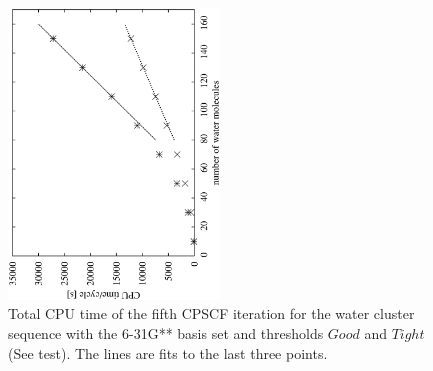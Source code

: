 \documentclass[twocolumn,showpacs,preprintnumbers,amsmath,amssymb]{revtex4}
\begin{document}
\begin{figure}
  \centering
  \caption{\protect
  Total CPU time of the fifth CPSCF iteration for the water
  cluster sequence with
  the 6-31G** basis set and thresholds $Good$ and $Tight$ (See test).
  The lines are fits to the last three points.
  }\label{fig:Alpha_h2o3D_6-31Gss_G_T_t}
  \begin{center}
    \includegraphics[angle=-90,width=0.5\textwidth]{Alpha_h2o3D_6-31Gss_G_T_t}
  \end{center}
\end{figure}
\end{document}
